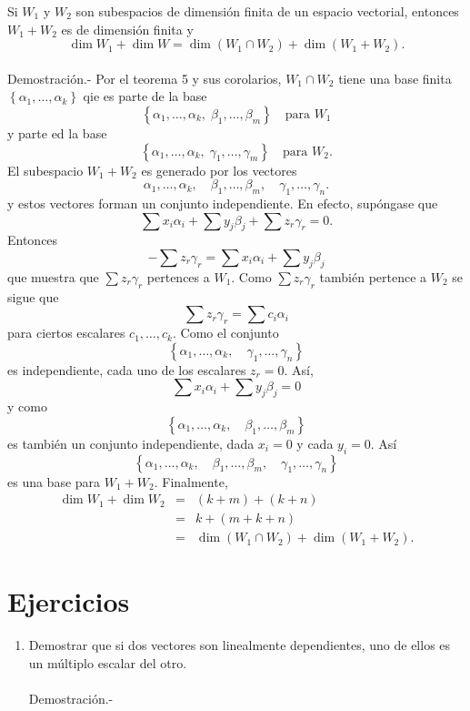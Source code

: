 \begin{teo}
    Si $W_1$ y $W_2$ son subespacios de dimensión finita de un espacio vectorial, entonces $W_1+W_2$ es de dimensión finita y
    $$\dim W_1+\dim W = \dim (W_1\cap W_2)+\dim (W_1+W_2).$$\\
	Demostración.-\; Por el teorema 5 y sus corolarios, $W_1\cap W_2$ tiene una base finita $\left\{\alpha_1,\ldots,\alpha_k\right\}$ qie es parte de la base
	$$\left\{\alpha_1,\ldots,\alpha_k,\; \beta_1,\ldots,\beta_m\right\}\quad \mbox{para }W_1$$
	y parte ed la base
	$$\left\{\alpha_1,\ldots,\alpha_k,\; \gamma_1,\ldots,\gamma_m\right\}\quad \mbox{para }W_2.$$
	El subespacio $W_1+W_2$ es generado por los vectores
	$$\alpha_1,\ldots,\alpha_k,\quad \beta_1,\ldots,\beta_m,\quad \gamma_1,\ldots,\gamma_n.$$
	y estos vectores forman un conjunto independiente. En efecto, supóngase que 
	$$\sum x_i\alpha_i + \sum y_j\beta_j + \sum z_r\gamma_r=0.$$
	Entonces 
	$$-\sum z_r\gamma_r = \sum x_i\alpha_i+\sum y_j\beta_j$$
	que muestra que $\sum z_r\gamma_r$ pertences a $W_1$. Como $\sum z_r\gamma_r$ también pertence a $W_2$ se sigue que
	$$\sum z_r\gamma_r = \sum c_i\alpha_i$$
	para ciertos escalares $c_1,\ldots,c_k$. Como el conjunto 
	$$\left\{\alpha_1,\ldots,\alpha_k,\quad \gamma_1,\ldots,\gamma_n\right\}$$
	es independiente, cada uno de los escalares $z_r=0$. Así, 
	$$\sum x_i\alpha_i + \sum y_j\beta_j=0$$
	y como 
	$$\left\{\alpha_1,\ldots,\alpha_k,\quad \beta_1,\ldots,\beta_m\right\}$$
	es también un conjunto independiente, dada $x_i=0$ y cada $y_i=0$. Así
	$$\left\{\alpha_1,\ldots,\alpha_k,\quad \beta_1,\ldots,\beta_m,\quad \gamma_1,\ldots,\gamma_n\right\}$$
	es una base para $W_1+W_2$. Finalmente,
	$$
	\begin{array}{rcl}
	    \dim W_1+\dim W_2 &=& (k+m)+(k+n)\\
			      &=& k+(m+k+n)\\
			      &=& \dim(W_1\cap W_2)+\dim(W_1+W_2).
	\end{array}
	$$
\end{teo}


\section*{Ejercicios}

\begin{enumerate}[\bfseries 1.]

    \item Demostrar que si dos vectores son linealmente dependientes, uno de ellos es un múltiplo escalar del otro.\\\\
	Demostración.-\;

\end{enumerate}
